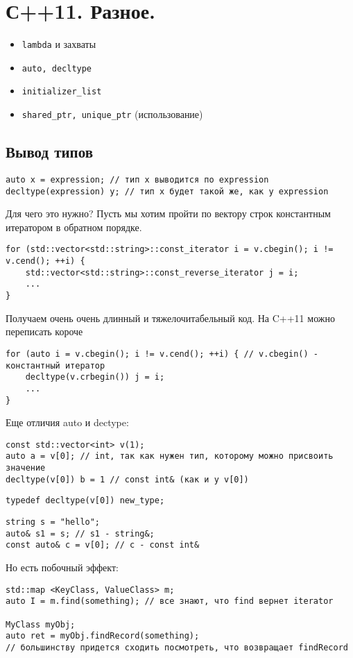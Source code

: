 \section{С++11. Разное.}
\begin{itemize}[noitemsep]
	\item \texttt{lambda} и захваты
	\item \texttt{auto, decltype}
	\item \texttt{initializer\_list}
	\item \texttt{shared\_ptr, unique\_ptr} (использование)
\end{itemize}
\subsection{Вывод типов}
\begin{verbatim}
auto x = expression; // тип x выводится по expression
decltype(expression) y; // тип x будет такой же, как у expression
\end{verbatim}
Для чего это нужно? Пусть мы хотим пройти по вектору строк константным итератором в обратном порядке. 
\begin{verbatim}
for (std::vector<std::string>::const_iterator i = v.cbegin(); i != v.cend(); ++i) {
    std::vector<std::string>::const_reverse_iterator j = i;
	...
}
\end{verbatim}
Получаем очень очень длинный и тяжелочитабельный код. На C++11 можно переписать короче
\begin{verbatim}
for (auto i = v.cbegin(); i != v.cend(); ++i) { // v.cbegin() - константный итератор
    decltype(v.crbegin()) j = i;
	...
}
\end{verbatim}
Еще отличия auto и dectype:
\begin{verbatim}
const std::vector<int> v(1);
auto a = v[0]; // int, так как нужен тип, которому можно присвоить значение
decltype(v[0]) b = 1 // const int& (как и у v[0])
\end{verbatim}
\begin{verbatim}
typedef decltype(v[0]) new_type;
\end{verbatim}
\begin{verbatim}
string s = "hello";
auto& s1 = s; // s1 - string&;
const auto& c = v[0]; // c - const int&
\end{verbatim}
Но есть побочный эффект:
\begin{verbatim}
std::map <KeyClass, ValueClass> m;
auto I = m.find(something); // все знают, что find вернет iterator

MyClass myObj;
auto ret = myObj.findRecord(something);
// большинству придется сходить посмотреть, что возвращает findRecord
\end{verbatim}
